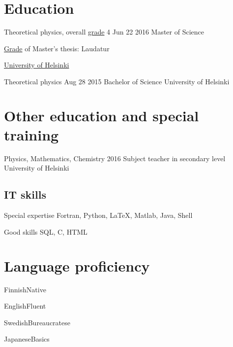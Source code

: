 \documentclass{tccv}
\begin{document}
\begin{otherlanguage}{english}


\section{Education}
\begin{yearlist}
	\item[Theoretical physics, overall \href{https://www.helsinki.fi/en/grading}{grade} 4]{Jun 22 2016}
	{Master of Science}
	{\href{https://www.helsinki.fi/en/grading}{Grade} of Master's thesis: Laudatur
		
		\href{mailto:registrar@helsinki.fi}{University of Helsinki}}
	
	\item[Theoretical physics]{Aug 28 2015}
	{Bachelor of Science}
	{University of Helsinki}
\end{yearlist}

\section{Other education and special training}
\begin{yearlist}
	\item[Physics, Mathematics, Chemistry]{2016}
	{Subject teacher in secondary level}
	{University of Helsinki}
\end{yearlist}

\subsection{IT skills}
\begin{factlist}
	\item{Special expertise}
	{Fortran, Python, \LaTeX, Matlab, Java, Shell}
	
	\item{Good skills}
	{SQL, C, HTML}
\end{factlist}

\section{Language proficiency}
\begin{factlist}
	\item{Finnish}{Native}
	\item{English}{Fluent}
	\item{Swedish}{Bureaucratese}
	\item{Japanese}{Basics}
\end{factlist}


\end{otherlanguage}
\end{document}
